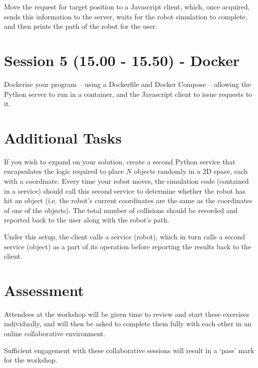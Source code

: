 \documentclass{article}
\begin{document}
Move the request for target position to a Javascript client, which, once acquired, sends this information to the server, waits for the robot simulation to complete, and then prints the path of the robot for the user.

\section{Session 5 (15.00 - 15.50) - Docker}

Dockerise your program -- using a Dockerfile and Docker Compose -- allowing the Python server to run in a container, and the Javascript client to issue requests to it.

\section{Additional Tasks}

If you wish to expand on your solution, create a second Python service that encapsulates the logic required to place $N$ objects randomly in a 2D space, each with a coordinate. 
Every time your robot moves, the simulation code (contained in a service) should call this second service to determine whether the robot has hit an object (i.e. the robot's current coordinates are the same as the coordinates of one of the objects).
The total number of collisions should be recorded and reported back to the user along with the robot's path.

Under this setup, the client calls a service (robot), which in turn calls a second service (object) as a part of its operation before reporting the results back to the client.

\section{Assessment}

Attendees at the workshop will be given time to review and start these exercises individually, and will then be asked to complete them fully with each other in an online collaborative environment.

Sufficient engagement with these collaborative sessions will result in a `pass' mark for the workshop.
\end{document}
